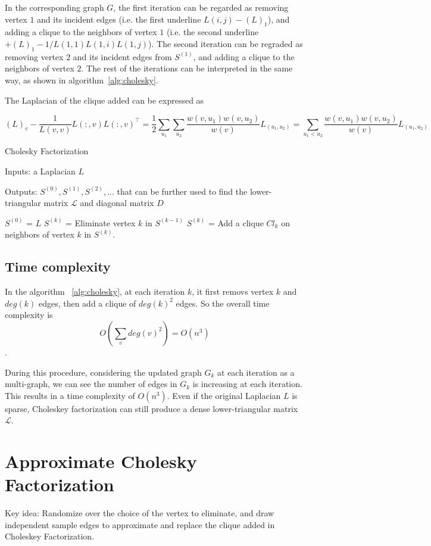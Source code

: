 \documentclass[11pt]{article}
\begin{document}
In the corresponding graph $G$, the first iteration can be regarded as removing vertex $1$ and its incident edges (i.e. the first underline $L(i,j) - (L)_1$), and adding a clique to the neighbors of vertex $1$ (i.e. the second underline $ + (L)_1 - 1/L(1,1) L(1,i)L(1,j)$). The second iteration can be regraded as removing vertex $2$ and its incident edges from $S^{(1)}$, and adding a clique to the neighbors of vertex $2$. The rest of the iterations can be interpreted in the same way, as shown in algorithm~\ref{alg:cholesky}. 

The Laplacian of the clique added can be expressed as

$$ (L)_v - \frac{1}{L(v,v)} L(:, v) L(:, v)^\top = \frac{1}{2} \sum_{u_1} \sum_{u_2}\frac{w(v,u_1) w(v,u_2)}{w(v)}L_{(u_1,u_2)} = \sum_{u_1<u_2}\frac{w(v,u_1) w(v,u_2)}{w(v)}L_{(u_1,u_2)} $$


\begin{algorithm}[H]

  \caption{Cholesky Factorization}
   \label{alg:cholesky}
   
  Inputs: a Laplacian $L$ 
  
  Outputs: $S^{(0)}, S^{(1)}, S^{(2)}, ...$ that can be further used to find the lower-triangular matrix $\mathcal{L}$ and diagonal matrix $D$
  \begin{algorithmic}[1]
  \State $S^{(0)}$ = $L$
    \State $S^{(k)}$ = Eliminate vertex $k$  in $S^{(k-1)}$
    \State $S^{(k)}$ = Add a clique $Cl_k$ on neighbors of vertex $k$ in $S^{(k)}$.
  \EndFor
  \end{algorithmic}
  \end{algorithm}


\subsection{Time complexity}
In the algorithm ~\ref{alg:cholesky}, at each iteration $k$, it first removs vertex $k$ and $deg(k)$ edges, then add a clique of $deg(k)^2$ edges. So the overall time complexity is $$O(\sum_v deg(v)^2) = O(n^3)$$. 

During this procedure, considering the updated graph $G_k$ at each iteration as a multi-graph, we can see the number of edges in $G_k$ is increasing at each iteration. This results in a time complexity of $O(n^3)$. Even if the original Laplacian $L$ is sparse, Choleskey factorization can still produce a dense lower-triangular matrix $\mathcal{L}$.


\section{Approximate Cholesky Factorization}
Key idea: Randomize over the choice of the vertex to eliminate, and draw independent sample edges to 
approximate and replace the clique added in Choleskey Factorization.
\end{document}
